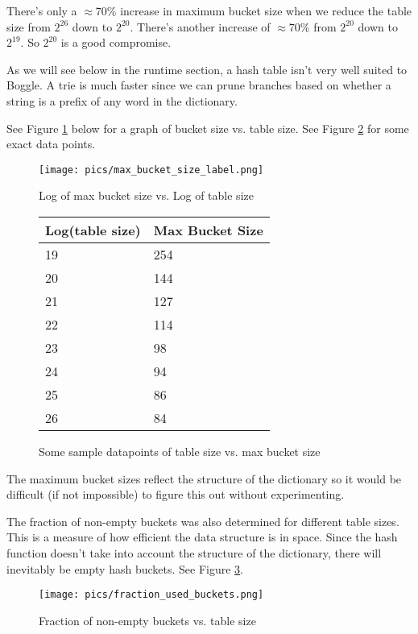 \documentclass{article}
\begin{document}
There's only a $\approx 70 \%$ increase in maximum bucket size when we reduce the table size from $2^{26}$ down to $2^{20}$. There's another increase of $\approx 70 \%$ from $2^{20}$ down to $2^{19}$. So $2^{20}$ is a good compromise. 

As we will see below in the runtime section, a hash table isn't very well suited to Boggle. A trie is much faster since we can prune branches based on whether a string is a prefix of any word in the dictionary. 

See Figure \ref{image:bucket_size} below for a graph of bucket size vs. table size. See Figure \ref{table:max_bucket} for some exact data points.  

\begin{figure}[htp]
\centering
\texttt{[image: pics/max\_bucket\_size\_label.png]}
\caption{Log of max bucket size vs. Log of table size}
\label{image:bucket_size}
\end{figure}

\begin{figure}[htp]
\centering
\begin{tabular}{l|l}
	 Log(table size) & Max Bucket Size\\ \hline
	19 & 254\\
	20 & 144\\
	21 & 127 \\
	22 & 114 \\
	23 & 98 \\
	24 & 94 \\
	25 & 86 \\
	26 & 84\\
\end{tabular}
\caption{Some sample datapoints of table size vs. max bucket size}
\label{table:max_bucket}
\end{figure}

The maximum bucket sizes reflect the structure of the dictionary so it would be difficult (if not impossible) to figure this out without experimenting. 

The fraction of non-empty buckets was also determined for different table sizes. This is a measure of how efficient the data structure is in space. Since the hash function doesn't take into account the structure of the dictionary, there will inevitably be empty hash buckets. See Figure \ref{image:fraction_used_buckets}.

\begin{figure}[htp]
\centering
\texttt{[image: pics/fraction\_used\_buckets.png]}
\caption{Fraction of non-empty buckets vs. table size} 
\label{image:fraction_used_buckets}
\end{figure}
\end{document}
